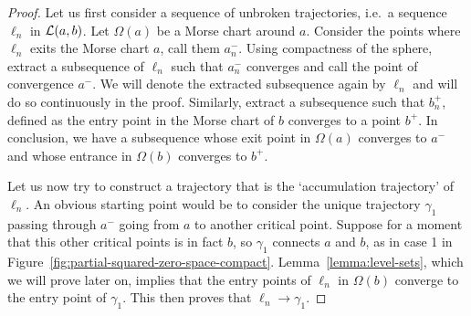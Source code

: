 \begin{proof}
    Let us first consider a sequence of unbroken trajectories, i.e.\ a sequence $\ell_n$ in $\mathcal L(a, b)$.
    Let $\Omega(a)$ be a Morse chart around $a$.
    Consider the points where $\ell_n$ exits the Morse chart $a$, call them $a_n^{-}$.
    Using compactness of the sphere, extract a subsequence of $\ell_n$ such that $a_{n}^{-}$ converges and call the point of convergence $a^{-}$.
    We will denote the extracted subsequence again by $\ell_n$ and will do so continuously in the proof.
    Similarly, extract a subsequence such that $b_n^{+}$, defined as the entry point in the Morse chart of $b$ converges to a point $b^{+}$.
    In conclusion, we have a subsequence whose exit point in $\Omega(a)$  converges to $a^{-}$ and whose entrance in $\Omega(b)$ converges to  $b^{+}$.

    Let us now try to construct a trajectory that is the `accumulation trajectory' of $\ell_n$.
    An obvious starting point would be to consider the unique trajectory $\gamma_1$ passing through $a^{-}$ going from $a$ to another critical point.
    Suppose for a moment that this other critical points is in fact $b$, so $\gamma_1$ connects  $a$ and  $b$, as in case 1 in Figure~\ref{fig:partial-squared-zero-space-compact}.
    Lemma~\ref{lemma:level-sets}, which we will prove later on, implies that the entry points of $\ell_n$ in $\Omega(b)$ converge to the entry point of $\gamma_1$. This then proves that $\ell_n \to  \gamma_1$.


\end{proof}
